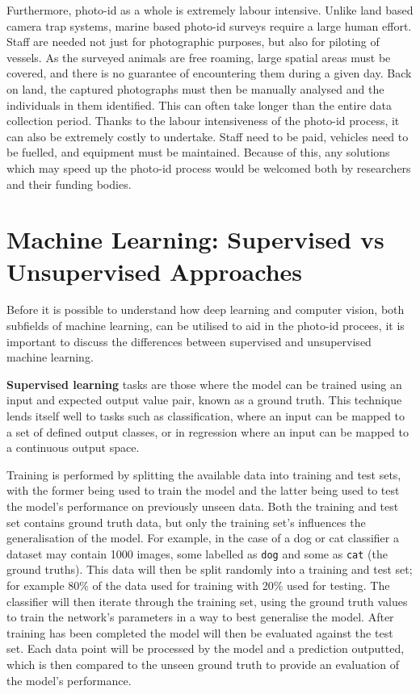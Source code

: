 Furthermore, photo-id as a whole is extremely labour intensive. Unlike land based camera trap systems, marine based photo-id surveys require a large human effort. Staff are needed not just for photographic purposes, but also for piloting of vessels. As the surveyed animals are free roaming, large spatial areas must be covered, and there is no guarantee of encountering them during a given day. Back on land, the captured photographs must then be manually analysed and the individuals in them identified. This can often take longer than the entire data collection period. Thanks to the labour intensiveness of the photo-id process, it can also be extremely costly to undertake. Staff need to be paid, vehicles need to be fuelled, and equipment must be maintained. Because of this, any solutions which may speed up the photo-id process would be welcomed both by researchers and their funding bodies. 

\section{Machine Learning: Supervised vs Unsupervised Approaches}\label{ch:Background,sec:DLIntro,sub:supervisedVsUnsupervisedLearning}

Before it is possible to understand how deep learning and computer vision, both subfields of machine learning, can be utilised to aid in the photo-id procees, it is important to discuss the differences between supervised and unsupervised machine learning.

\textbf{Supervised learning} tasks are those where the model can be trained using an input and expected output value pair, known as a ground truth. This technique lends itself well to tasks such as classification, where an input can be mapped to a set of defined output classes, or in regression where an input can be mapped to a continuous output space. 

Training is performed by splitting the available data into training and test sets, with the former being used to train the model and the latter being used to test the model's performance on previously unseen data. Both the training and test set contains ground truth data, but only the training set's influences the generalisation of the model. For example, in the case of a dog or cat classifier a dataset may contain 1000 images, some labelled as \texttt{dog} and some as \texttt{cat} (the ground truths). This data will then be split randomly into a training and test set; for example 80\% of the data used for training with 20\% used for testing. The classifier will then iterate through the training set, using the ground truth values to train the network's parameters in a way to best generalise the model. After training has been completed the model will then be evaluated against the test set. Each data point will be processed by the model and a prediction outputted, which is then compared to the unseen ground truth to provide an evaluation of the model's performance.

